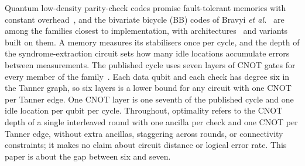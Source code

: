 \documentclass[reprint,twocolumn,superscriptaddress,nofootinbib]{revtex4-2}
\theoremstyle{plain}
\begin{document}
Quantum low-density parity-check codes promise fault-tolerant memories
with constant overhead~\cite{BreuckmannEberhardt2021,Panteleev2022,
LeverrierZemor2022,Dinur2023}, and the bivariate bicycle (BB) codes of
Bravyi \emph{et al.}~\cite{Bravyi2024} are among the families closest to
implementation, with architectures~\cite{Yoder2025,Xu2024} and
variants~\cite{Voss2024,WangMueller2024,Berthusen2025,LiangChen2026} built
on them. A memory measures its stabilisers once per cycle, and the depth of
the syndrome-extraction circuit sets how many idle locations accumulate
errors between measurements. The published cycle uses seven layers of CNOT
gates for every member of the family~\cite{Bravyi2024}. Each data qubit
and each check has degree six in the Tanner graph, so six layers is a lower
bound for any circuit with one CNOT per Tanner edge. One CNOT layer is one
seventh of the published cycle and one idle location per qubit per cycle.
Throughout, optimality refers to the CNOT depth of a single interleaved
round with one ancilla per check and one CNOT per Tanner edge, without
extra ancillas, staggering across rounds, or connectivity constraints; it
makes no claim about circuit distance or logical error rate. This paper is
about the gap between six and seven.
\end{document}
